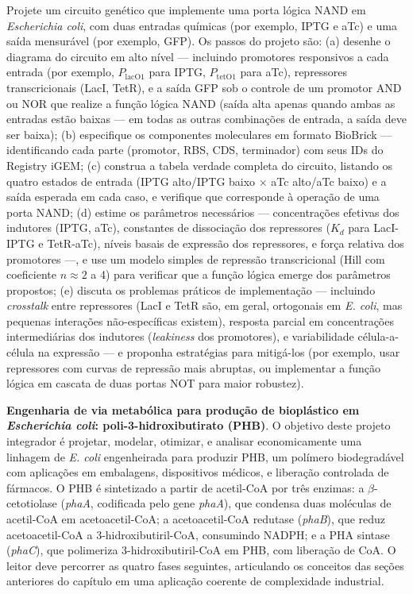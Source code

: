 \begin{exercicio}
Projete um circuito genético que implemente uma porta lógica NAND em \textit{Escherichia coli}, com duas entradas químicas (por exemplo, IPTG e aTc) e uma saída mensurável (por exemplo, GFP). Os passos do projeto são: (a) desenhe o diagrama do circuito em alto nível --- incluindo promotores responsivos a cada entrada (por exemplo, $P_{\text{lacO1}}$ para IPTG, $P_{\text{tetO1}}$ para aTc), repressores transcricionais (LacI, TetR), e a saída GFP sob o controle de um promotor AND ou NOR que realize a função lógica NAND (saída alta apenas quando ambas as entradas estão baixas --- em todas as outras combinações de entrada, a saída deve ser baixa); (b) especifique os componentes moleculares em formato BioBrick --- identificando cada parte (promotor, RBS, CDS, terminador) com seus IDs do Registry iGEM; (c) construa a tabela verdade completa do circuito, listando os quatro estados de entrada (IPTG alto/IPTG baixo $\times$ aTc alto/aTc baixo) e a saída esperada em cada caso, e verifique que corresponde à operação de uma porta NAND; (d) estime os parâmetros necessários --- concentrações efetivas dos indutores (IPTG, aTc), constantes de dissociação dos repressores ($K_d$ para LacI-IPTG e TetR-aTc), níveis basais de expressão dos repressores, e força relativa dos promotores ---, e use um modelo simples de repressão transcricional (Hill com coeficiente $n \approx 2$ a 4) para verificar que a função lógica emerge dos parâmetros propostos; (e) discuta os problemas práticos de implementação --- incluindo \emph{crosstalk} entre repressores (LacI e TetR são, em geral, ortogonais em \textit{E. coli}, mas pequenas interações não-específicas existem), resposta parcial em concentrações intermediárias dos indutores (\emph{leakiness} dos promotores), e variabilidade célula-a-célula na expressão --- e proponha estratégias para mitigá-los (por exemplo, usar repressores com curvas de repressão mais abruptas, ou implementar a função lógica em cascata de duas portas NOT para maior robustez).
\end{exercicio}


\begin{exercicio}
\textbf{Engenharia de via metabólica para produção de bioplástico em \textit{Escherichia coli}: poli-3-hidroxibutirato (PHB)}. O objetivo deste projeto integrador é projetar, modelar, otimizar, e analisar economicamente uma linhagem de \textit{E. coli} engenheirada para produzir PHB, um polímero biodegradável com aplicações em embalagens, dispositivos médicos, e liberação controlada de fármacos. O PHB é sintetizado a partir de acetil-CoA por três enzimas: a $\beta$-cetotiolase (\textit{phaA}, codificada pelo gene \textit{phaA}), que condensa duas moléculas de acetil-CoA em acetoacetil-CoA; a acetoacetil-CoA redutase (\textit{phaB}), que reduz acetoacetil-CoA a 3-hidroxibutiril-CoA, consumindo NADPH; e a PHA sintase (\textit{phaC}), que polimeriza 3-hidroxibutiril-CoA em PHB, com liberação de CoA. O leitor deve percorrer as quatro fases seguintes, articulando os conceitos das seções anteriores do capítulo em uma aplicação coerente de complexidade industrial.
\end{exercicio}

